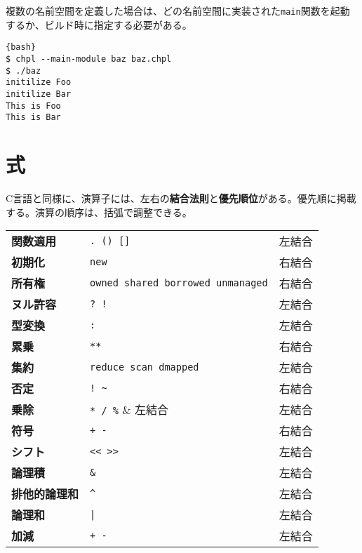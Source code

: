 \documentclass[10pt,a4paper]{book}
\begin{document}
複数の名前空間を定義した場合は、どの名前空間に実装された\texttt{main}関数を起動するか、ビルド時に指定する必要がある。

\begin{Verbatim}{bash}
$ chpl --main-module baz baz.chpl
$ ./baz
initilize Foo
initilize Bar
This is Foo
This is Bar
\end{Verbatim}

\chapter{式\label{chap:op}}

C言語と同様に、演算子には、左右の\textbf{結合法則}と\textbf{優先順位}がある。優先順に掲載する。演算の順序は、括弧で調整できる。

\begin{table}[h]
\raggedright
\begin{tabular}{lll}
\textbf{関数適用}     & \verb#. () []#                          & 左結合 \\
\textbf{初期化}       & \verb#new#                              & 右結合 \\
\textbf{所有権}       & \verb#owned shared borrowed unmanaged#  & 右結合 \\
\textbf{ヌル許容}     & \verb#? !#                              & 左結合 \\
\textbf{型変換}       & \verb#:#                                & 左結合 \\
\textbf{累乗}         & \verb#**#                               & 右結合 \\
\textbf{集約}         & \verb#reduce scan dmapped#              & 左結合 \\
\textbf{否定}         & \verb#! ~#                              & 右結合 \\
\textbf{乗除}         & \verb#* / %#                            & 左結合 \\
\textbf{符号}         & \verb#+ -#                              & 右結合 \\
\textbf{シフト}       & \verb#<< >>#                            & 左結合 \\
\textbf{論理積}       & \verb#&#                                & 左結合 \\
\textbf{排他的論理和} & \verb#^#                                & 左結合 \\
\textbf{論理和}       & \verb#|#                                & 左結合 \\
\textbf{加減}         & \verb#+ -#                              & 左結合 \\

\end{tabular}
\end{table}
\end{document}
